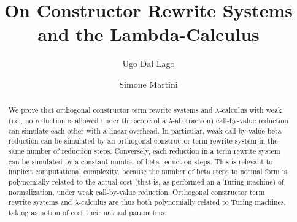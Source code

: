 \documentclass{LMCS}
\newcounter{number}
\begin{document}
\title[On Constructor Rewrite Systems and the Lambda-Calculus]{On Constructor Rewrite Systems\\ and the Lambda-Calculus\rsuper*}
\author[U.~Dal Lago]{Ugo Dal Lago}
\author[S.~Martini]{Simone Martini}
\address{Universit\`a di Bologna, and INRIA Sophia Antipolis}

  

\begin{abstract}\noindent
We prove that orthogonal constructor term rewrite systems and $\lambda$-calculus with weak 
(i.e., no reduction is allowed under  the scope of a $\lambda$-abstraction)
call-by-value reduction can simulate each other with a linear overhead.
In particular, weak call-by-value beta-reduction can be simulated by an orthogonal 
constructor term rewrite system in the same number of reduction steps. 
Conversely, each reduction in a term rewrite system can be simulated by a constant number 
of beta-reduction steps. This is relevant to implicit computational complexity, because the number of beta steps 
to normal form is polynomially related to the actual cost (that is, as performed on a Turing 
machine) of normalization, under weak call-by-value reduction. Orthogonal constructor term rewrite systems 
and $\lambda$-calculus are thus both polynomially related to Turing machines, taking as notion 
of cost their natural parameters.
\end{abstract}

\maketitle
\end{document}
